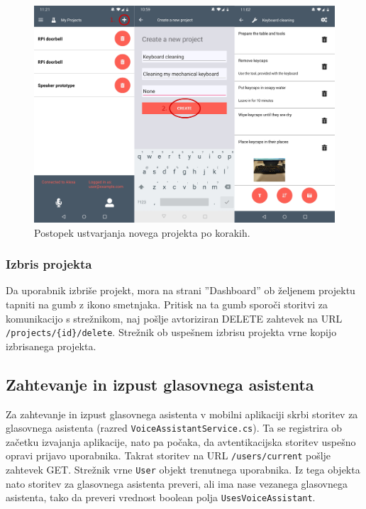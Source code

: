 \documentclass[a4paper, 12pt]{book}
\begin{document}
\begin{figure}[H]
\begin{center}
\includegraphics[width=13cm]{app_newproject}
\end{center}
	\caption{Postopek ustvarjanja novega projekta po korakih.}
\label{app_newproject}
\end{figure}

\subsubsection{Izbris projekta}

Da uporabnik izbriše projekt, mora na strani ''Dashboard'' ob željenem projektu tapniti na gumb z ikono smetnjaka.
Pritisk na ta gumb sporoči storitvi za komunikacijo s strežnikom, naj pošlje avtoriziran DELETE zahtevek na URL \texttt{/projects/\{id\}/delete}.
Strežnik ob uspešnem izbrisu projekta vrne kopijo izbrisanega projekta.

\subsection{Zahtevanje in izpust glasovnega asistenta}

Za zahtevanje in izpust glasovnega asistenta v mobilni aplikaciji skrbi storitev za glasovnega asistenta (razred \texttt{VoiceAssistantService.cs}).
Ta se registrira ob začetku izvajanja aplikacije, nato pa počaka, da avtentikacijska storitev uspešno opravi prijavo uporabnika.
Takrat storitev na URL \texttt{/users/current} pošlje zahtevek GET.
Strežnik vrne \texttt{User} objekt trenutnega uporabnika.
Iz tega objekta nato storitev za glasovnega asistenta preveri, ali ima nase vezanega glasovnega asistenta, tako da preveri vrednost boolean polja \texttt{UsesVoiceAssistant}.
\end{document}
